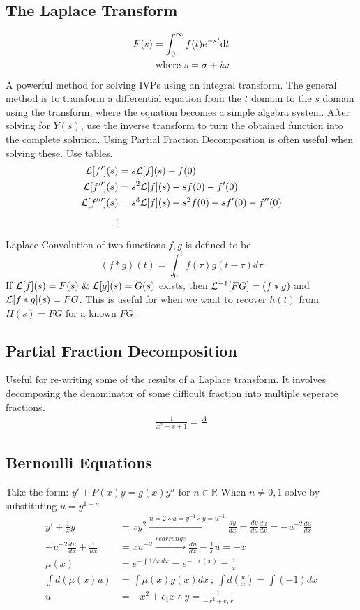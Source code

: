 \subsection{The Laplace Transform}
    \begin{align*}
        F(s) =\int_0^\infty f(t) e^{-st} {\rm d} t \\ \text{ where } s = \sigma + i\omega
    \end{align*}
    A powerful method for solving IVPs using an integral transform. The general method is to transform a differential equation from the $t$ domain to the $s$ domain using the transform, where the equation becomes a simple algebra system. After solving for $Y(s)$, use the inverse transform to turn the obtained function into the complete solution.  Using Partial Fraction Decomposition is often useful when solving these. Use tables.
    \begin{align*}
        \mathcal{L}[f'](s)&=s\mathcal{L}[f](s)-f(0)
        \\
        \mathcal{L}[f''](s)&=s^2\mathcal{L}[f](s)-sf(0)-f'(0)
        \\
        \mathcal{L}[f'''](s)&=s^3\mathcal{L}[f](s)-s^2f(0)-sf'(0)-f''(0)
        \\
        \vdots
    \end{align*}
    Laplace Convolution of two functions $f,g$ is defined to be 
    \[
    (f*g)(t)=\int_0^tf(\tau)g(t-\tau)d\tau
    \]
    If $\mathcal{L}[f](s)=F(s)~\&~\mathcal{L}[g](s)=G(s)$ exists, then $\mathcal{L}^{-1}[FG]=(f*g)$ and $\mathcal{L}[f*g](s)=FG$. This is useful for when we want to recover $h(t)$ from $H(s)=FG$ for a known $FG$.
\subsection{Partial Fraction Decomposition}
    Useful for re-writing some of the results of a Laplace transform. It involves decomposing the denominator of some difficult fraction into multiple seperate fractions. 
    \begin{align*}
        \frac{1}{x^2-x+1}=\frac{A}{}
    \end{align*}
\newpage
\subsection{Bernoulli Equations}
    Take the form: $y'+P(x)y=g(x)y^n$ for $n \in \mathbb{R}$ When $n \neq 0,1$ solve by substituting $u=y^{1-n}$
    \begin{align*}
        y'+\frac{1}{x}y&=xy^2\xrightarrow{n=2\ \therefore\ u=y^{-1}\ \therefore\ y=u^{-1}} \frac{dy}{dx}=\frac{dy}{du}\frac{du}{dx}=-u^{-2}\frac{du}{dx}\\
        -u^{-2}\frac{du}{dx}+\frac{1}{ux}&=xu^{-2}\xrightarrow{rearrange}\frac{du}{dx}-\frac{1}{x}u=-x\\
        \mu(x)&=e^{-\int 1/x\ dx}=e^{-\ln(x)}=\frac{1}{x}\\
        \int d(\mu(x)u)&=\int \mu(x)g(x)dx\ ;\ \int d\left(\frac{u}{x}\right)=\int (-1)dx\\
        u&=-x^2+c_1x\ \therefore\ \boxed{y=\frac{1}{-x^2+c_1x}}
        \end{align*}
